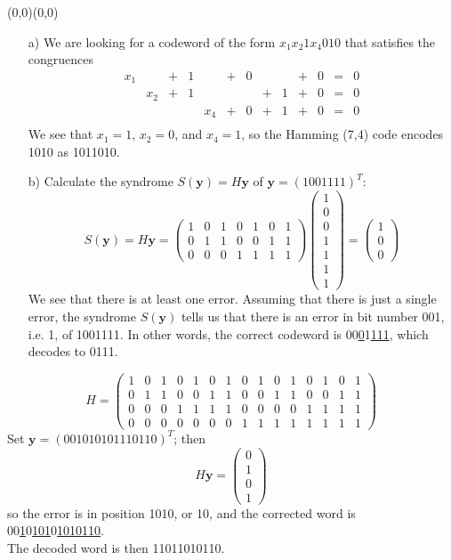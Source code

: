 \documentclass[11pt]{article}
\renewcommand{\vec}[1]{\mathbf{#1}}
\newcommand{\vc}[1]{\begin{pmatrix}#1\end{pmatrix}}
\newcommand{\moveup}{\begin{picture}(0,0)(0,0)\end{picture}\vspace*{-8.15mm}}
\begin{document}
\bigskip
{}\moveup
\begin{itemize}
  \item[{a)}]
    We are looking for a codeword of the form $x_1 x_2 1 x_4 0 1 0$ that satisfies the congruences
    \[
      \begin{array}{ccccccccccccc}
        x_1 &      &+& 1    &   &+& 0 & &   &+& 0 &=& 0\\
            & x_2  &+& 1    &   & &   &+& 1 &+& 0 &=& 0\\
            &      & &      &x_4&+& 0 &+& 1 &+& 0 &=& 0\\
      \end{array}
    \]
    We see that $x_1 = 1$, $x_2 = 0$, and $x_4 = 1$, so the Hamming (7,4) code encodes 1010 as 1011010.
  \item[{b)}]
    Calculate the syndrome $S(\vec{y}) = H\vec{y}$ of $\vec{y} = (1001111)^T$:\vspace*{-7mm}
  \[
      S(\vec{y})
    = H\vec{y}
    = \vc{1& 0& 1& 0& 1& 0& 1\\
          0& 1& 1& 0& 0& 1& 1\\
          0& 0& 0& 1& 1& 1& 1}
      \vc{1\\0\\0\\1\\1\\1\\1}
    = \vc{1\\0\\0}
  \]
  We see that there is at least one error.
  Assuming that there is just a single error, the syndrome $S(\vec{y})$ tells us that there is an error in bit number 001, i.e. 1, of 1001111.
  In other words, the correct codeword is 00\underline{0}1\underline{111}, which decodes to 0111.
\end{itemize}

\bigskip
{}\vspace*{-5mm}
\[
  H = \left(\begin{array}{ccccccccccccccc}
        1&0&1&0&1&0&1&0&1&0&1&0&1&0&1\\
        0&1&1&0&0&1&1&0&0&1&1&0&0&1&1\\
        0&0&0&1&1&1&1&0&0&0&0&1&1&1&1\\
        0&0&0&0&0&0&0&1&1&1&1&1&1&1&1\end{array}\right)
\]
Set $\vec{y} = (001010101110110)^T$; then
\[
  H\vec{y} = \vc{0\\1\\0\\1}
\]
so the error is in position 1010, or 10,
and the corrected word is 00\underline{1}0\underline{101}0\underline{1010110}.\\
The decoded word is then 11011010110.
\end{document}
